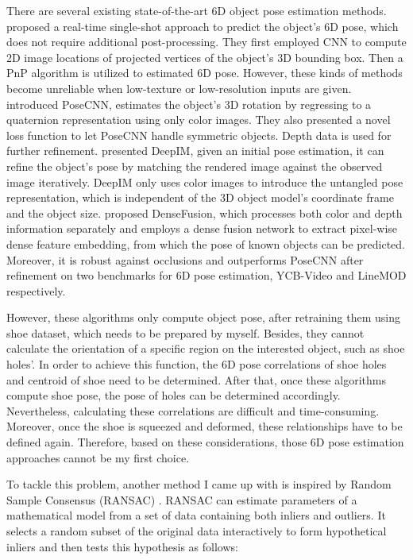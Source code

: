 There are several existing state-of-the-art 6D object pose estimation methods. \citep{singleshot} proposed a real-time single-shot approach to predict the object's 6D pose, which does not require additional post-processing. They first employed CNN to compute 2D image locations of projected vertices of the object's 3D bounding box. Then a PnP algorithm is utilized to estimated 6D pose. However, these kinds of methods become unreliable when low-texture or low-resolution inputs are given. \citep{PoseCNN} introduced PoseCNN, estimates the object's 3D rotation by regressing to a quaternion representation using only color images. They also presented a novel loss function to let PoseCNN handle symmetric objects. Depth data is used for further refinement. \citep{DeepIM} presented DeepIM, given an initial pose estimation, it can refine the object's pose by matching the rendered image against the observed image iteratively. DeepIM only uses color images to introduce the untangled pose representation, which is independent of the 3D object model's coordinate frame and the object size. \citep{DenseFusion} proposed DenseFusion, which processes both color and depth information separately and employs a dense fusion network to extract pixel-wise dense feature embedding, from which the pose of known objects can be predicted. Moreover, it is robust against occlusions and outperforms PoseCNN after refinement on two benchmarks for 6D pose estimation, YCB-Video \citep{PoseCNN} and LineMOD \citep{linemod} respectively.

However, these algorithms only compute object pose, after retraining them using shoe dataset, which needs to be prepared by myself. Besides, they cannot calculate the orientation of a specific region on the interested object, such as shoe holes'. In order to achieve this function, the 6D pose correlations of shoe holes and centroid of shoe need to be determined. After that, once these algorithms compute shoe pose, the pose of holes can be determined accordingly. Nevertheless, calculating these correlations are difficult and time-consuming. Moreover, once the shoe is squeezed and deformed, these relationships have to be defined again. Therefore, based on these considerations, those 6D pose estimation approaches cannot be my first choice.

To tackle this problem, another method I came up with is inspired by Random Sample Consensus (RANSAC) \citep{rsc}. RANSAC can estimate parameters of a mathematical model from a set of data containing both inliers and outliers. It selects a random subset of the original data interactively to form hypothetical inliers and then tests this hypothesis as follows:

